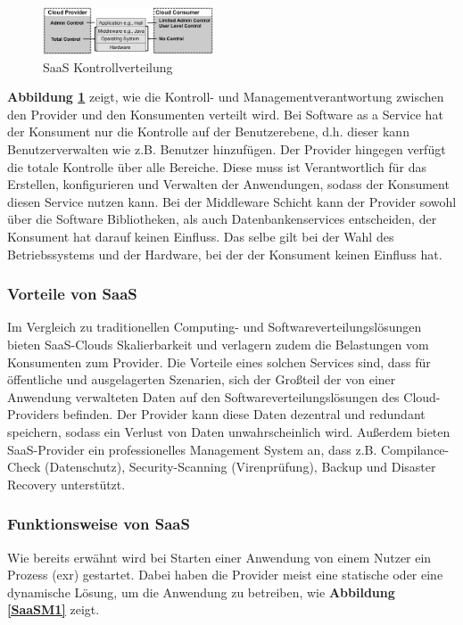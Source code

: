 \begin{figure}[H]
    \centering
	\includegraphics[width=0.45\textwidth]{Images/SaaSControl}
	\caption{SaaS Kontrollverteilung \cite{Badger}}
	\label{SaaSControl}
\end{figure}

\textbf{Abbildung \ref{SaaSControl}} zeigt, wie die Kontroll- und Managementverantwortung zwischen den Provider und den Konsumenten verteilt wird.
Bei Software as a Service hat der Konsument nur die Kontrolle auf der Benutzerebene, d.h. dieser kann Benutzerverwalten wie z.B. Benutzer hinzufügen.
Der Provider hingegen verfügt die totale Kontrolle über alle Bereiche. Diese muss ist Verantwortlich für das Erstellen, konfigurieren und Verwalten der Anwendungen, 
sodass der Konsument diesen Service nutzen kann.
Bei der Middleware Schicht kann der Provider sowohl über die Software Bibliotheken, als auch Datenbankenservices entscheiden, der Konsument hat darauf keinen Einfluss.
Das selbe gilt bei der Wahl des Betriebssystems und der Hardware, bei der der Konsument keinen Einfluss hat.

\subsubsection*{Vorteile von SaaS}

Im Vergleich zu traditionellen Computing- und Softwareverteilungslösungen bieten SaaS-Clouds Skalierbarkeit und verlagern zudem die Belastungen vom Konsumenten zum Provider.
Die Vorteile eines solchen Services sind, dass für öffentliche und ausgelagerten Szenarien, sich der Großteil der von einer Anwendung verwalteten Daten auf den Softwareverteilungslösungen
des Cloud-Providers befinden. Der Provider kann diese Daten dezentral und redundant speichern, sodass ein Verlust von Daten unwahrscheinlich wird. Außerdem bieten SaaS-Provider
ein professionelles Management System an, dass z.B. Compilance-Check (Datenschutz), Security-Scanning (Virenprüfung), Backup und Disaster Recovery unterstützt.

\subsubsection{Funktionsweise von SaaS}

Wie bereits erwähnt wird bei Starten einer Anwendung von einem Nutzer ein Prozess (exr) gestartet. Dabei haben die Provider meist eine statische oder eine dynamische
Lösung, um die Anwendung zu betreiben, wie \textbf{Abbildung \ref{SaaSM1}} zeigt.

